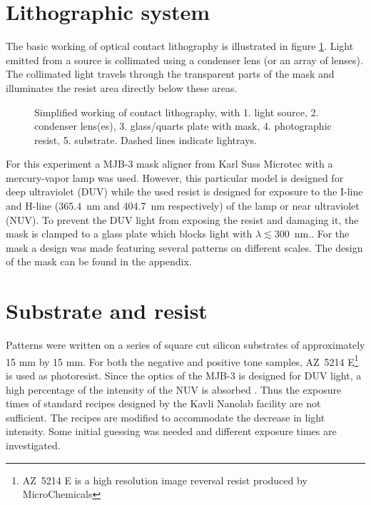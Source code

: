 \section*{Lithographic system}
The basic working of optical contact lithography is illustrated in figure \ref{fig:contact-litho}. Light emitted from a source is collimated using a condenser lens (or an array of lenses). The collimated light travels through the transparent parts of the mask and illuminates the resist area directly below these areas. 
\begin{figure}[H]
	\centering
	\resizebox{0.7\linewidth}{!}{}
	\caption{Simplified working of contact lithography, with 1. light source, 2. condenser lens(es), 3. glass/quarts plate with mask, 4. photographic resist, 5. substrate. Dashed lines indicate lightrays.}
	\label{fig:contact-litho}
\end{figure} For this experiment a MJB-3 mask aligner from Karl Suss Microtec with a mercury-vapor lamp was used. However, this particular model is designed for deep ultraviolet (DUV) while the used resist is designed for exposure to the I-line and H-line (365.4~nm and 404.7~nm respectively) of the lamp or near ultraviolet (NUV). To prevent the DUV light from exposing the resist and damaging it, the mask is clamped to a glass plate which blocks light with $\lambda \lesssim 300$~nm..
For the mask a design was made featuring several patterns on different scales. The design of the mask can be found in the appendix.


\section*{Substrate and resist}
Patterns were written on a series of square cut silicon substrates of approximately 15 mm by 15 mm. For both the negative and positive tone samples, AZ~5214 E\footnote{AZ~5214 E is a high resolution image reversal resist produced by MicroChemicals} is used as photoresist. Since the optics of the MJB-3 is designed for DUV light, a high percentage of the intensity of the NUV is absorbed . Thus the exposure times of standard recipes designed by the Kavli Nanolab facility are not sufficient. The recipes are modified to accommodate the decrease in light intensity. Some initial guessing was needed and different exposure times are investigated.

